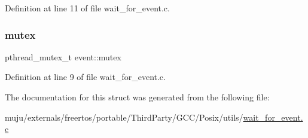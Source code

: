 Definition at line 11 of file wait\+\_\+for\+\_\+event.\+c.

\mbox{\label{structevent_a2f6413c912a397ad2ca600e012f97a52}} 
\subsubsection{\texorpdfstring{mutex}{mutex}}
{\footnotesize\ttfamily pthread\+\_\+mutex\+\_\+t event\+::mutex}



Definition at line 9 of file wait\+\_\+for\+\_\+event.\+c.



The documentation for this struct was generated from the following file\+:\begin{DoxyCompactItemize}
\item 
muju/externals/freertos/portable/\+Third\+Party/\+G\+C\+C/\+Posix/utils/\hyperlink{wait__for__event_8c}{wait\+\_\+for\+\_\+event.\+c}\end{DoxyCompactItemize}
